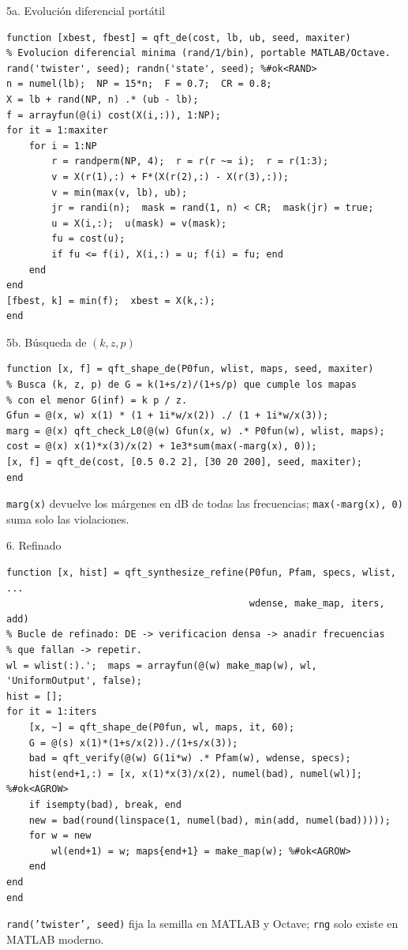 \documentclass[aspectratio=169,11pt]{beamer}
\begin{document}
\begin{frame}[fragile]{5a. Evolución diferencial portátil}
\scriptsize
\begin{verbatim}
function [xbest, fbest] = qft_de(cost, lb, ub, seed, maxiter)
% Evolucion diferencial minima (rand/1/bin), portable MATLAB/Octave.
rand('twister', seed); randn('state', seed); %#ok<RAND>
n = numel(lb);  NP = 15*n;  F = 0.7;  CR = 0.8;
X = lb + rand(NP, n) .* (ub - lb);
f = arrayfun(@(i) cost(X(i,:)), 1:NP);
for it = 1:maxiter
    for i = 1:NP
        r = randperm(NP, 4);  r = r(r ~= i);  r = r(1:3);
        v = X(r(1),:) + F*(X(r(2),:) - X(r(3),:));
        v = min(max(v, lb), ub);
        jr = randi(n);  mask = rand(1, n) < CR;  mask(jr) = true;
        u = X(i,:);  u(mask) = v(mask);
        fu = cost(u);
        if fu <= f(i), X(i,:) = u; f(i) = fu; end
    end
end
[fbest, k] = min(f);  xbest = X(k,:);
end
\end{verbatim}
\end{frame}

\begin{frame}[fragile]{5b. Búsqueda de $(k,z,p)$}
\footnotesize
\begin{verbatim}
function [x, f] = qft_shape_de(P0fun, wlist, maps, seed, maxiter)
% Busca (k, z, p) de G = k(1+s/z)/(1+s/p) que cumple los mapas
% con el menor G(inf) = k p / z.
Gfun = @(x, w) x(1) * (1 + 1i*w/x(2)) ./ (1 + 1i*w/x(3));
marg = @(x) qft_check_L0(@(w) Gfun(x, w) .* P0fun(w), wlist, maps);
cost = @(x) x(1)*x(3)/x(2) + 1e3*sum(max(-marg(x), 0));
[x, f] = qft_de(cost, [0.5 0.2 2], [30 20 200], seed, maxiter);
end
\end{verbatim}
\footnotesize \texttt{marg(x)} devuelve los márgenes en dB de todas las frecuencias; \texttt{max(-marg(x), 0)} suma solo las violaciones.
\end{frame}

\begin{frame}[fragile]{6. Refinado}
\scriptsize
\begin{verbatim}
function [x, hist] = qft_synthesize_refine(P0fun, Pfam, specs, wlist, ...
                                           wdense, make_map, iters, add)
% Bucle de refinado: DE -> verificacion densa -> anadir frecuencias
% que fallan -> repetir.
wl = wlist(:).';  maps = arrayfun(@(w) make_map(w), wl, 'UniformOutput', false);
hist = [];
for it = 1:iters
    [x, ~] = qft_shape_de(P0fun, wl, maps, it, 60);
    G = @(s) x(1)*(1+s/x(2))./(1+s/x(3));
    bad = qft_verify(@(w) G(1i*w) .* Pfam(w), wdense, specs);
    hist(end+1,:) = [x, x(1)*x(3)/x(2), numel(bad), numel(wl)]; %#ok<AGROW>
    if isempty(bad), break, end
    new = bad(round(linspace(1, numel(bad), min(add, numel(bad)))));
    for w = new
        wl(end+1) = w; maps{end+1} = make_map(w); %#ok<AGROW>
    end
end
end
\end{verbatim}
\footnotesize \texttt{rand('twister', seed)} fija la semilla en MATLAB y Octave; \texttt{rng} solo existe en MATLAB moderno.
\end{frame}
\end{document}
